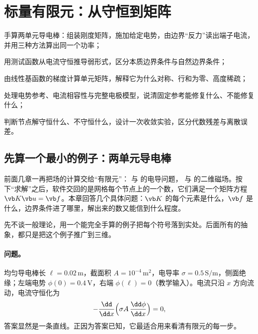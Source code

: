 \chapter{标量有限元：从守恒到矩阵}\label{ch:femscalar}

\begin{chapterguide}
\begin{guidegoals}
\item 手算两单元导电棒：组装刚度矩阵，施加给定电势，由边界“反力”读出端子电流，并用三种方法算出同一个功率；
\item 用测试函数从电流守恒推导弱形式，区分本质边界条件与自然边界条件；
\item 由线性基函数的梯度计算单元矩阵，解释它为什么对称、行和为零、高度稀疏；
\item 处理电势参考、电流相容性与完整电极模型，说清固定参考能修复什么、不能修复什么；
\item 判断节点解守恒什么、不守恒什么，设计一次收敛实验，区分代数残差与离散误差。
\end{guidegoals}
\end{chapterguide}

\section{先算一个最小的例子：两单元导电棒}\label{sec:femscalar-bar}

前面几章一再把场的计算交给“有限元”： 与 的电导问题， 与 的二维磁场。按下“求解”之后，软件交回的是网格每个节点上的一个数，它们满足一个矩阵方程 $\vb K\vb u=\vb f$。本章回答几个具体问题：$\vb K$ 的每个元素是什么，$\vb f$ 是什么，边界条件进了哪里，解出来的数又能信到什么程度。

先不谈一般理论，用一个能完全手算的例子把每个符号落到实处。后面所有的抽象，都只是把这个例子推广到三维。

\subsubsection{问题。} 均匀导电棒长 $\ell=0.02\,\mathrm m$，截面积 $A=10^{-4}\,\mathrm{m^2}$，电导率 $\sigma=0.5\,\mathrm{S/m}$，侧面绝缘；左端电势 $\phi(0)=0.4\,\mathrm V$，右端 $\phi(\ell)=0$（教学输入）。电流只沿 $x$ 方向流动，电流守恒化为
\begin{equation*}
-\frac{\dd}{\dd x}\Bigl(\sigma A\,\frac{\dd\phi}{\dd x}\Bigr)=0 ,
\end{equation*}
答案显然是一条直线。正因为答案已知，它最适合用来看清有限元的每一步。

